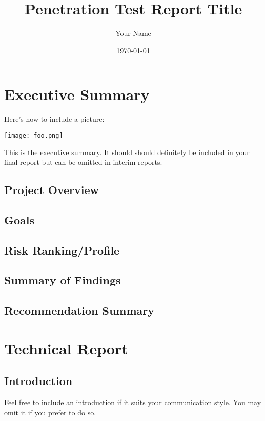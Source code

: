 \documentclass[notitlepage]{article}
\begin{document}
	
	
	\title{Penetration Test Report Title}
	\author{Your Name}
	\date{\isodate\today}
	
	\maketitle
	
	\tableofcontents
	
	\newpage
	\section{Executive Summary}
	
	Here's how to include a picture:
	
	\texttt{[image: foo.png]}
	
	This is the executive summary.
	It should should definitely be included in your final report but can be omitted in interim reports.
	
	
	\subsection{Project Overview}
	
	\subsection{Goals}
	
	\subsection{Risk Ranking/Profile}
	
	\subsection{Summary of Findings}
	
	\subsection{Recommendation Summary}
	
	
	\section{Technical Report}
	
	\subsection{Introduction}
	Feel free to include an introduction if it suits your communication style.
	You may omit it if you prefer to do so.
	
\end{document}
